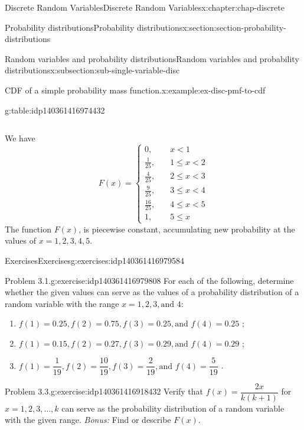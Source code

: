 \documentclass[oneside,10pt,]{book}
\numberwithin{equation}{section}
\newcommand{\lt}{<}
\newcommand{\amp}{&}
\begin{document}
\begin{chapterptx}{Discrete Random Variables}{}{Discrete Random Variables}{}{}{x:chapter:chap-discrete}
\begin{sectionptx}{Probability distributions}{}{Probability distributions}{}{}{x:section:section-probability-distributions}
\begin{subsectionptx}{Random variables and probability distributions}{}{Random variables and probability distributions}{}{}{x:subsection:sub-single-variable-disc}
\begin{example}{CDF of a simple probability mass function.}{x:example:ex-disc-pmf-to-cdf}
\begin{tableptx}{\textbf{}}{g:table:idp140361416974432}{}
{\begin{tabular}{lll}
\end{tabular}
}%
\end{tableptx}%
 We have%
\begin{equation*}
F(x) = \begin{cases} 0, \amp \quad x \lt 1\\
\frac{1}{25}, \amp \quad 1 \le x \lt 2\\
\frac{4}{25}, \amp \quad 2 \le x \lt 3\\
\frac{9}{25}, \amp \quad 3 \le x \lt 4\\
\frac{16}{25}, \amp \quad 4 \le x \lt 5\\
1, \amp \quad 5 \le x
\end{cases}
\end{equation*}
The function \(F(x)\), is piecewise constant, accumulating new probability at the values of \(x = 1, 2, 3, 4, 5\).%
\end{example}
\end{subsectionptx}
%
%
\typeout{************************************************}
\typeout{************************************************}
%
\begin{exercises-subsection}{Exercises}{}{Exercises}{}{}{g:exercises:idp140361416979584}
\begin{divisionexercise}{1}{Problem 3.1.}{}{g:exercise:idp140361416979808}%
For each of the following, determine whether the given values can serve as the values of a probability distribution of a random variable with the range \(x = 1, 2, 3, \text{and } 4\):%
\begin{enumerate}[label=(\alph*)]
\item{}\(\displaystyle f(1) = 0.25,f(2) = 0.75,f(3) = 0.25, \text{and } f(4) =
0.25\)%
; \item{}\(\displaystyle f(1) = 0.15,f(2) = 0.27,f(3) = 0.29, \text{and } f(4) =
0.29\)%
; \item{}\(\displaystyle f(1) = \dfrac{1}{19},f(2) = \dfrac{10}{19},f(3) =
\dfrac{2}{19}, \text{and } f(4) = \dfrac{5}{19}\)%
.\end{enumerate}
%
\end{divisionexercise}%
\begin{divisionexercise}{2}{Problem 3.3.}{}{g:exercise:idp140361416918432}%
Verify that \(\displaystyle f(x) = \dfrac{2x}{k(k+1)}\) for \(x=1, 2,
3, \dots, k\) can serve as the probability distribution of a random variable with the given range. \emph{Bonus:} Find or describe \(F(x)\).\textbraceright{}%
\end{divisionexercise}%

\end{exercises-subsection}
\end{sectionptx}
\end{chapterptx}
\end{document}
